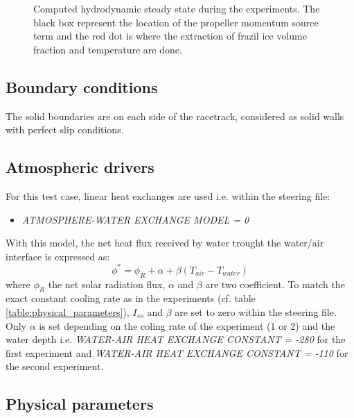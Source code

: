 \begin{figure}[H]
    \begin{center}
    \end{center}
    \caption{Computed hydrodynamic steady state during the experiments. The black box represent the location of the propeller 
momentum source term and the red dot is where the extraction of frazil ice volume fraction and temperature are done.}
    \label{fig:hydro}
\end{figure}

\subsection{Boundary conditions}

The solid boundaries are on each side of the racetrack, considered as solid walls with perfect slip conditions.

\subsection{Atmospheric drivers}

For this test case, linear heat exchanges are used i.e. within the \khione steering file:
\begin{itemize}
	\item\textit{ATMOSPHERE-WATER EXCHANGE MODEL = 0}
\end{itemize}
With this model, the net heat flux received by water trought the water/air interface is expressed as:
\begin{equation}
\phi^* = \phi_R + \alpha + \beta (T_{air} - T_{water})
\end{equation}
where $\phi_R$ the net solar radiation flux, $\alpha$ and $\beta$ are two coefficient. 
To match the exact constant cooling rate as in the experiments (cf. table \ref{table:physical_parameters}), 
$I_{so}$ and $\beta$ are set to zero within the \khione steering file.
Only $\alpha$ is set depending on the coling rate of the experiment (1 or 2) and the water depth i.e.
\textit{WATER-AIR HEAT EXCHANGE CONSTANT = -280} for the first experiment and
\textit{WATER-AIR HEAT EXCHANGE CONSTANT = -110} for the second experiment.

\subsection{Physical parameters}

